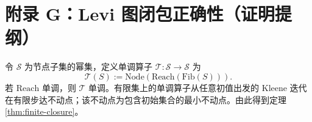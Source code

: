 \section{附录 G：Levi 图闭包正确性（证明提纲）}
\label{app:levi-closure-proof}

令 $\mathcal{S}$ 为节点子集的幂集，定义单调算子 $\mathcal{T}:\mathcal{S}\to\mathcal{S}$ 为
\[
\mathcal{T}(S):=\mathrm{Node}(\mathrm{Reach}(\mathrm{Fib}(S))).
\]
若 $\mathrm{Reach}$ 单调，则 $\mathcal{T}$ 单调。有限集上的单调算子从任意初值出发的 Kleene 迭代在有限步达不动点；该不动点为包含初始集合的最小不动点。由此得到定理 \ref{thm:finite-closure}。

